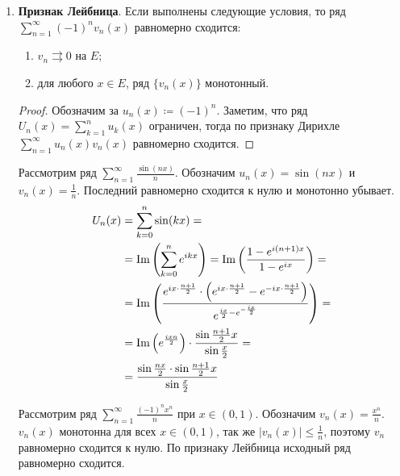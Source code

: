 \begin{prop}
\begin{enumerate}
\begin{proof}
\[\begin{aligned}
					\end{aligned}
				\]
				Так как $ v_n \rightrightarrows 0$, $ \lvert v_1(x) - v_n(x) \rvert \underset{n \to \infty}{\longrightarrow} \lvert v_1(x) \rvert $. Значит, частичная сумма ряда стремится к $ M \cdot \lvert v_1(x) \rvert $, следовательно\footnote{Например, по признаку сравнения}, второе слагаемое тоже равномерно сходится, а тогда и сумма равномерно сходится.
			\end{proof}
		\item {\bf Признак Лейбница}. Если выполнены следующие условия, то ряд $ \sum_{n=1}^{\infty} (-1)^{n}v_n(x)$ равномерно сходится:
			\begin{enumerate}[noitemsep]
				\item $ v_n \rightrightarrows 0$ на $ E$;
				\item для любого $ x \in E$, ряд $ \{v_n(x)\}$ монотонный.
			\end{enumerate}
			\begin{proof}
				Обозначим за $ u_n(x) \coloneqq (-1)^{n}$. Заметим, что ряд $ U_n(x) = \sum_{k=1}^{n} u_k(x)$ ограничен, тогда по признаку Дирихле $ \sum_{n=1}^{\infty} u_n(x)v_n(x)$ равномерно сходится.
			\end{proof}
			\begin{ex}
				Рассмотрим ряд $ \sum_{n=1}^{\infty} \frac{\sin(nx)}{n}$. Обозначим $ u_n(x) = \sin(nx)$ и $ v_n(x) = \frac{1}{n}$. Последний равномерно сходится к нулю и монотонно убывает.
				\[
					\begin{aligned}
						U_n(x) &= \sum_{k=0}^{n} \sin(kx) = \\
							   &= \operatorname{Im}\left(  \sum_{k=0}^{n} e^{ikx}  \right) = \operatorname{Im} \left( \frac{1-e^{i(n+1)x}}{1 - e^{ix}} \right) = \\
							   &= \operatorname{Im}\left( \frac{e^{ix\cdot \frac{n+1}{2}} \cdot \left( e^{ix\cdot \frac{n+1}{2}}- e^{-ix\cdot \frac{n+1}{2}} \right)}{e^{\frac{ix}{2} - e^{-\frac{ix}{2}}}}  \right)  = \\
							   &= \operatorname{Im} \left( e^{\frac{ixn}{2}} \right) \cdot \frac{\sin \frac{n+1}{2}x }{\sin  \frac{x}{2} } = \\
							   &= \frac{\sin \frac{nx}{2} \cdot \sin\frac{n+1}{2}x}{\sin \frac{x}{2}}
					\end{aligned}
				\]
			\end{ex}
			\begin{ex}
				Рассмотрим ряд $ \sum_{n=1}^{\infty} \frac{(-1)^{n}x^{n}}{n}$ при $ x \in (0, 1)$. Обозначим $ v_n(x) = \frac{x^{n}}{n}$. $ v_n(x)$ монотонна для всех $ x \in (0, 1)$, так же  $ \lvert v_n(x) \rvert \le \frac{1}{n}$, поэтому $ v_n$ равномерно сходится к нулю.  По признаку Лейбница исходный ряд равномерно сходится.

\end{ex}
\end{enumerate}
\end{prop}
